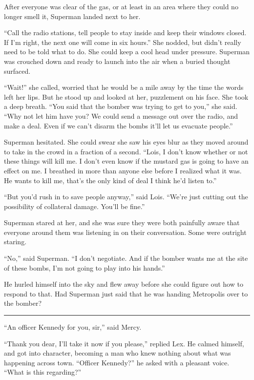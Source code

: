 \documentclass[ebook,12pt]{memoir}
\begin{document}
After everyone was clear of the gas, or at least in an area where they
could no longer smell it, Superman landed next to her.

``Call the radio stations, tell people to stay inside and keep their
windows closed. If I'm right, the next one will come in six hours.'' She
nodded, but didn't really need to be told what to do. She could keep a
cool head under pressure. Superman was crouched down and ready to launch
into the air when a buried thought surfaced.

``Wait!'' she called, worried that he would be a mile away by the time
the words left her lips. But he stood up and looked at her, puzzlement
on his face. She took a deep breath. ``You said that the bomber was
trying to get to you,'' she said. ``Why not let him have you? We could
send a message out over the radio, and make a deal. Even if we can't
disarm the bombs it'll let us evacuate people.''

Superman hesitated. She could swear she saw his eyes blur as they moved
around to take in the crowd in a fraction of a second. ``Lois, I don't
know whether or not these things will kill me. I don't even know if the
mustard gas is going to have an effect on me. I breathed in more than
anyone else before I realized what it was. He wants to kill me, that's
the only kind of deal I think he'd listen to.''

``But you'd rush in to save people anyway,'' said Lois. ``We're just
cutting out the possibility of collateral damage. You'll be fine.''

Superman stared at her, and she was sure they were both painfully aware
that everyone around them was listening in on their conversation. Some
were outright staring.

``No,'' said Superman. ``I don't negotiate. And if the bomber wants me
at the site of these bombs, I'm not going to play into his hands.''

He hurled himself into the sky and flew away before she could figure out
how to respond to that. Had Superman just said that he was handing
Metropolis over to the bomber?

\begin{center}\rule{0.5\linewidth}{0.5pt}\end{center}

``An officer Kennedy for you, sir,'' said Mercy.

``Thank you dear, I'll take it now if you please,'' replied Lex. He
calmed himself, and got into character, becoming a man who knew nothing
about what was happening across town. ``Officer Kennedy?'' he asked with
a pleasant voice. ``What is this regarding?''
\end{document}
